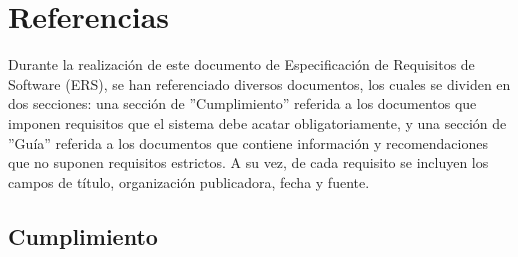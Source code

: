 \chapter{Referencias}

Durante la realización de este documento de Especificación de Requisitos de Software (ERS), se han referenciado diversos documentos, los cuales se dividen en dos secciones: una sección de ''Cumplimiento'' referida a los documentos que imponen requisitos que el sistema debe acatar obligatoriamente, y una sección de ''Guía'' referida a los documentos que contiene información y recomendaciones que no suponen requisitos estrictos. A su vez, de cada requisito se incluyen los campos de título, organización publicadora, fecha y fuente.

\section{Cumplimiento}

